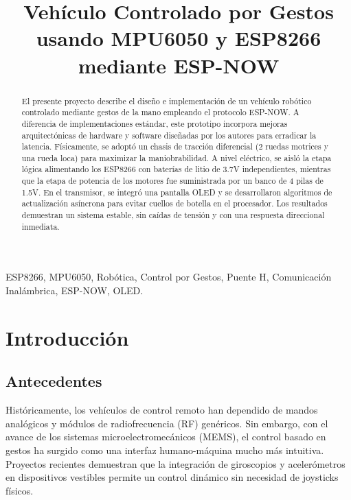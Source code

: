 \documentclass[conference]{IEEEtran}
\begin{document}
\title{Vehículo Controlado por Gestos usando MPU6050 y ESP8266 mediante ESP-NOW}

\author{
\and
{}
}

\maketitle

\begin{abstract}
El presente proyecto describe el diseño e implementación de un vehículo robótico controlado mediante gestos de la mano empleando el protocolo ESP-NOW. A diferencia de implementaciones estándar, este prototipo incorpora mejoras arquitectónicas de hardware y software diseñadas por los autores para erradicar la latencia. Físicamente, se adoptó un chasis de tracción diferencial (2 ruedas motrices y una rueda loca) para maximizar la maniobrabilidad. A nivel eléctrico, se aisló la etapa lógica alimentando los ESP8266 con baterías de litio de 3.7V independientes, mientras que la etapa de potencia de los motores fue suministrada por un banco de 4 pilas de 1.5V. En el transmisor, se integró una pantalla OLED y se desarrollaron algoritmos de actualización asíncrona para evitar cuellos de botella en el procesador. Los resultados demuestran un sistema estable, sin caídas de tensión y con una respuesta direccional inmediata.
\end{abstract}

\begin{IEEEkeywords}
ESP8266, MPU6050, Robótica, Control por Gestos, Puente H, Comunicación Inalámbrica, ESP-NOW, OLED.
\end{IEEEkeywords}

\section{Introducción}
\subsection{Antecedentes}
Históricamente, los vehículos de control remoto han dependido de mandos analógicos y módulos de radiofrecuencia (RF) genéricos. Sin embargo, con el avance de los sistemas microelectromecánicos (MEMS), el control basado en gestos ha surgido como una interfaz humano-máquina mucho más intuitiva. Proyectos recientes demuestran que la integración de giroscopios y acelerómetros en dispositivos vestibles permite un control dinámico sin necesidad de joysticks físicos.
\end{document}

